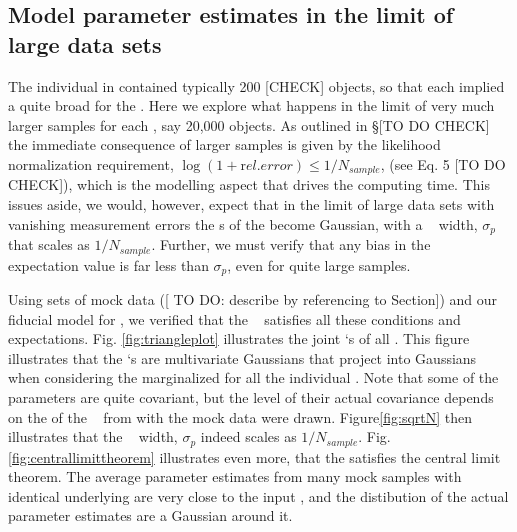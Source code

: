 \subsection{Model parameter estimates in the limit of large data sets}

The individual \MAP in \citet{bov13} contained typically 200 [CHECK] objects, so that each \MAP implied a quite broad \pdf  for the \pmodel .
Here we explore what happens in the limit of very much larger samples for each \MAP , say 20,000 objects. As outlined in \S [TO DO CHECK] the immediate consequence of larger samples is given by the likelihood normalization requirement, $\log(1+{\mathrm rel. error})\le 1/N_{sample}$, (see Eq. 5 [TO DO CHECK]), which is the modelling aspect that drives the computing time. This issues aside, we would, however, expect that in the limit of large data sets with vanishing measurement errors the \pdf s of the \pmodel become Gaussian, with a \pdf~ width, $\sigma_p$ that scales as $1/N_{sample}$. Further, we must verify that any bias in the \pdf~ expectation value is far less than 
$\sigma_p$, even for quite large samples.

 Using sets of mock data ([ TO DO: describe by referencing to Section]) and our fiducial model for \pmodel , we verified that the \RM~ satisfies all these conditions and expectations. Fig. \ref{fig:triangleplot} illustrates the joint \pdf `s of all \pmodel . This figure illustrates that the \pdf `s are multivariate Gaussians that project into Gaussians when considering the marginalized \pdf for all the individual \pmodel . Note that some of the parameters are quite covariant, but the level of their actual covariance depends on the of the \pmodel~ from with the mock data were drawn.  Figure\ref{fig:sqrtN} then illustrates that the \pdf~ width, $\sigma_p$ indeed scales as $1/N_{sample}$.
Fig.\ref{fig:centrallimittheorem} illustrates even more, that the \RM satisfies the central limit theorem. The average parameter estimates from many mock samples with identical underlying \pmodel are very close to the input \pmodel , and the distibution of the actual parameter estimates are a Gaussian around it. 



